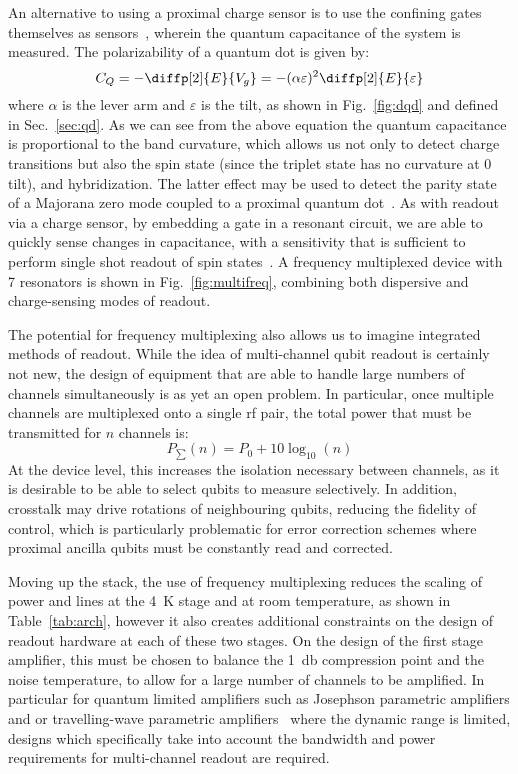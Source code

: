 An alternative to using a proximal charge sensor is to use the confining gates themselves as sensors~\cite{PhysRevLett.110.046805}, wherein the quantum capacitance
of the system is measured. The polarizability of a quantum dot is given by:
\begin{equation}
  C_Q = - \diffp[2]{E}{{V_{g}}} = -(\alpha \varepsilon)^2 \diffp[2]{E}{\varepsilon}
\end{equation}
where $\alpha$ is the lever arm and $\varepsilon$ is the tilt, as shown in Fig.~\ref{fig:dqd} and defined in Sec.~\ref{sec:qd}. As we can see from the above equation
the quantum capacitance is proportional to the band curvature, which allows us not only to detect charge transitions but also the spin state (since the triplet state has no
curvature at 0 tilt), and hybridization. The latter effect may be used to detect the parity state of a Majorana zero mode coupled to a proximal
quantum dot~\cite{PhysRevB.95.235305}. As with readout via a charge sensor, by embedding a gate in a resonant circuit, we are able to quickly sense changes
in capacitance, with a sensitivity that is sufficient to perform single shot readout of spin states~\cite{fernando1,Nnano_dzurak}. A frequency multiplexed device
with 7 resonators is shown in Fig.~\ref{fig:multifreq}, combining both dispersive and charge-sensing modes of readout.

The potential for frequency multiplexing also allows us to imagine integrated methods of readout. While the idea of multi-channel qubit readout is certainly
not new, the design of equipment that are able to handle large numbers of channels simultaneously is as yet an open problem. In particular, once multiple
channels are multiplexed onto a single rf pair, the total power that must be transmitted for $n$ channels is:
\begin{equation}
  P_\sum(n) = P_0 + 10 \log_{10}(n)
\end{equation}
At the device level, this increases the isolation necessary between channels, as it is desirable to be able to select qubits to measure selectively. In addition,
crosstalk may drive rotations of neighbouring qubits, reducing the fidelity of control, which is particularly problematic for error correction schemes
where proximal ancilla qubits must be constantly read and corrected.

Moving up the stack, the use of frequency multiplexing reduces the scaling of power and lines at the \SI{4}{\kelvin} stage and at room temperature, as shown in
Table~\ref{tab:arch}, however it also creates additional constraints on the design of readout hardware at each of these two stages.
On the design of the first stage amplifier, this must be chosen to balance the \SI{1}{\decibel} compression point and the noise temperature, to allow for a large number of
channels to be amplified. In particular for quantum limited amplifiers such as Josephson parametric amplifiers and or travelling-wave parametric amplifiers~\cite{Macklin307}
where the dynamic range is limited, designs which specifically take into account the bandwidth and power requirements for multi-channel readout are required.

